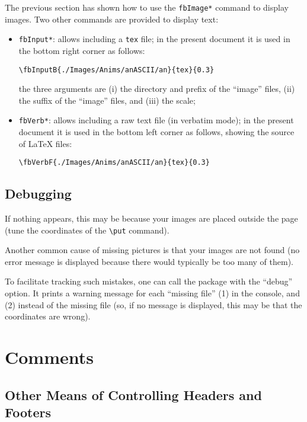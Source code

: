 \documentclass[a4paper,twoside]{article}
\begin{document}
The previous section has shown how to use the \verb+fbImage*+ command
to display images. Two other commands are provided to display text:
\begin{itemize}
\item \verb+fbInput*+: allows including a \verb+tex+ file; in the
  present document it is used in the bottom right corner as follows:
\begin{verbatim}
\fbInputB{./Images/Anims/anASCII/an}{tex}{0.3}
\end{verbatim}
the three arguments are (i) the directory and prefix of the ``image''
files, (ii) the suffix of the ``image'' files, and (iii) the scale;
\item \verb+fbVerb*+: allows including a raw text file (in verbatim
  mode); in the present document it is used in the bottom left corner
  as follows, showing the source of \LaTeX{} files:
\begin{verbatim}
\fbVerbF{./Images/Anims/anASCII/an}{tex}{0.3}
\end{verbatim}
\end{itemize}

\subsection{Debugging}

If nothing appears, this may be because your images are placed outside
the page (tune the coordinates of the \verb+\put+ command).

Another common cause of missing pictures is that your images are not
found (no error message is displayed because there would typically be
too many of them).

To facilitate tracking such mistakes, one can call the package with
the ``debug'' option. It prints a warning message for each ``missing
file'' (1) in the console, and (2) instead of the missing file (so, if
no message is displayed, this may be that the coordinates are wrong).

\section{Comments}

\subsection{Other Means of Controlling Headers and Footers}
\label{sec:other}
\end{document}
